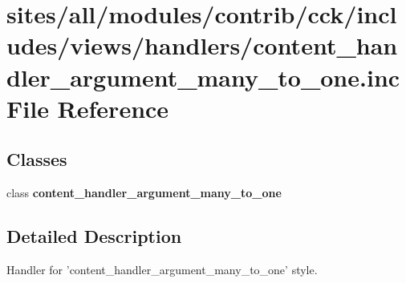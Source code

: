 \hypertarget{content__handler__argument__many__to__one_8inc}{
\section{sites/all/modules/contrib/cck/includes/views/handlers/content\_\-handler\_\-argument\_\-many\_\-to\_\-one.inc File Reference}
\label{content__handler__argument__many__to__one_8inc}
}
\subsection*{Classes}
\begin{CompactItemize}
\item 
class \textbf{content\_\-handler\_\-argument\_\-many\_\-to\_\-one}
\end{CompactItemize}


\subsection{Detailed Description}
Handler for 'content\_\-handler\_\-argument\_\-many\_\-to\_\-one' style. 